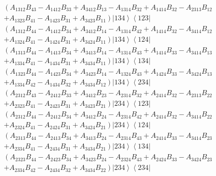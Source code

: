 \documentclass[aps,preprint]{revtex4}%
\begin{document}
\begin{align}
&  \left(  A_{1312}B_{43}-A_{1412}B_{33}+A_{3412}B_{13}-A_{1314}%
B_{32}+A_{1414}B_{32}-A_{2313}B_{12}\right.  \nonumber\\
&  \left.  +A_{1323}B_{41}-A_{1423}B_{31}+A_{3423}B_{11}\right)  \left\vert
134\right\rangle \left\langle 123\right\vert \nonumber\\
&  \left(  A_{1312}B_{44}-A_{1412}B_{34}+A_{3412}B_{14}-A_{1314}%
B_{42}+A_{1414}B_{32}-A_{3414}B_{12}\right.  \nonumber\\
&  \left.  +A_{1324}B_{41}-A_{1424}B_{31}+A_{3424}B_{11}\right)  \left\vert
134\right\rangle \left\langle 124\right\vert \nonumber\\
&  \left(  A_{1313}B_{44}-A_{1413}B_{34}+A_{3413}B_{14}-A_{1314}%
B_{43}+A_{1414}B_{33}-A_{3414}B_{13}\right.  \nonumber\\
&  \left.  +A_{1334}B_{41}-A_{1434}B_{31}+A_{3434}B_{11}\right)  \left\vert
134\right\rangle \left\langle 134\right\vert \nonumber\\
&  \left(  A_{1323}B_{44}-A_{1423}B_{34}+A_{3423}B_{14}-A_{1324}%
B_{43}+A_{1424}B_{33}-A_{3424}B_{13}\right.  \nonumber\\
&  \left.  +A_{1334}B_{42}-A_{1434}B_{32}+A_{3434}B_{12}\right)  \left\vert
134\right\rangle \left\langle 234\right\vert
\end{align}%
\begin{align}
&  \left(  A_{2312}B_{43}-A_{2412}B_{33}+A_{3412}B_{23}-A_{2314}%
B_{32}+A_{2414}B_{32}-A_{2313}B_{22}\right.  \nonumber\\
&  \left.  +A_{2323}B_{41}-A_{2423}B_{31}+A_{3423}B_{21}\right)  \left\vert
234\right\rangle \left\langle 123\right\vert \nonumber\\
&  \left(  A_{2312}B_{44}-A_{2412}B_{34}+A_{3412}B_{24}-A_{2314}%
B_{42}+A_{2414}B_{32}-A_{3414}B_{22}\right.  \nonumber\\
&  \left.  +A_{2324}B_{41}-A_{2424}B_{31}+A_{3424}B_{21}\right)  \left\vert
234\right\rangle \left\langle 124\right\vert \nonumber\\
&  \left(  A_{2313}B_{44}-A_{2413}B_{34}+A_{3413}B_{24}-A_{2314}%
B_{43}+A_{2414}B_{33}-A_{3414}B_{23}\right.  \nonumber\\
&  \left.  +A_{2334}B_{41}-A_{2434}B_{31}+A_{3434}B_{21}\right)  \left\vert
234\right\rangle \left\langle 134\right\vert \nonumber\\
&  \left(  A_{2323}B_{44}-A_{2423}B_{34}+A_{3423}B_{24}-A_{2324}%
B_{43}+A_{2424}B_{33}-A_{3424}B_{23}\right.  \nonumber\\
&  \left.  +A_{2334}B_{42}-A_{2434}B_{32}+A_{3434}B_{22}\right)  \left\vert
234\right\rangle \left\langle 234\right\vert
\end{align}
\end{document}
